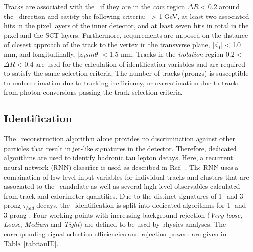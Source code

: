 Tracks are associated with the \tauhadvis\ if they are
in the \textit{core} region $\Delta R$ < 0.2 
around the \tauhadvis\ direction and 
satisfy the following criteria: \pt\ > 1 GeV, 
at least two associated hits in the pixel layers of the inner detector, 
and at least seven hits in total in the pixel and the SCT layers. 
Furthermore, requirements are imposed on 
the distance of closest approach of the track to the vertex
in the transverse plane, $|d_0|$ < 1.0 mm, and
longitudinally, $|z_0 sin\theta|$ < 1.5 mm. 
Tracks in the \textit{isolation} region 0.2 < $\Delta R$ < 0.4 
are used for the calculation of identification variables 
and are required to satisfy the same selection criteria.
The number of tracks (prongs) is susceptible
to underestimation due to tracking inefficiency, 
or overestimation due to tracks from
photon conversions passing the track selection criteria.

\subsection{Identification}
The \tauhadvis\ reconstruction algorithm alone provides 
no discrimination against other particles that result in
jet-like signatures in the detector. 
Therefore, dedicated algorithms are used to identify hadronic tau lepton
decays. Here, a recurrent neural network (RNN) classifier 
is used as described in Ref.~\cite{ATL-PHYS-PUB-2019-033}.
The RNN uses a combination of low-level input variables 
for individual tracks and clusters that are associated 
to the \tauhadvis\ candidate as well as several 
high-level observables calculated from track and
calorimeter quantities.
Due to the distinct signatures of 1- and 3-prong $\tau_{had}$ decays, 
the \tauhadvis\ identification is split into dedicated
algorithms for 1- and 3-prong \tauhadvis. 
Four working points with increasing background rejection 
(\textit{Very loose}, \textit{Loose}, \textit{Medium}
and \textit{Tight}) are defined to be used by physics analyses.
The corresponding signal selection efficiencies and
rejection powers are given in Table~\ref{tab:tauID}.

